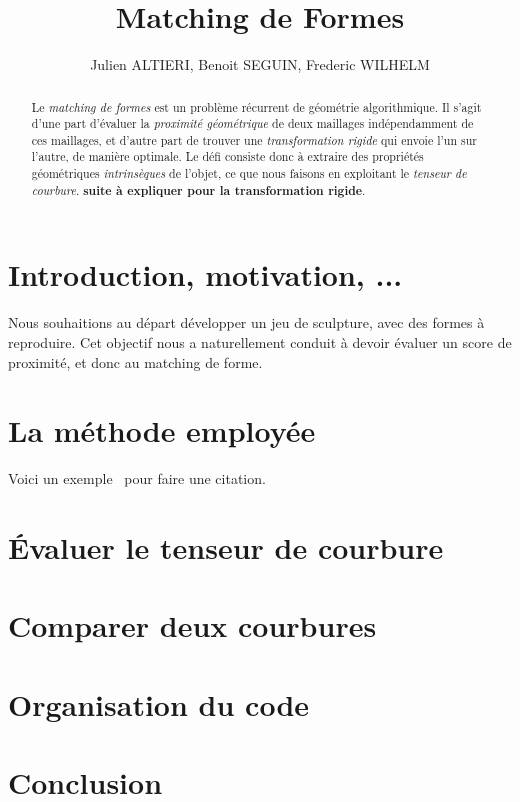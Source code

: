 \documentclass{llncs}
\begin{document}
\title{Matching de Formes}

\author{Julien ALTIERI, Benoit SEGUIN, Frederic WILHELM}



\maketitle

\begin{abstract}
Le \textit{matching de formes} est un probl\`eme r\'ecurrent de g\'eom\'etrie algorithmique. Il s'agit d'une part d'\'evaluer la \textit{proximit\'e g\'eom\'etrique} de deux maillages ind\'ependamment de ces maillages, et d'autre part de trouver une \textit{transformation rigide} qui envoie l'un sur l'autre, de mani\`ere optimale. Le d\'efi consiste donc à extraire des propri\'et\'es g\'eom\'etriques \textit{intrins\`eques} de l'objet, ce que nous faisons en exploitant le \textit{tenseur de courbure}. \textbf{suite \`a expliquer pour la transformation rigide}.
\end{abstract}

\section{Introduction, motivation, ...}
Nous souhaitions au d\'epart d\'evelopper un jeu de sculpture, avec des formes \`a reproduire. Cet objectif nous a naturellement conduit \`a devoir \'evaluer un score de proximit\'e, et donc au matching de forme.






\section{La m\'ethode employ\'ee}
Voici un exemple~\cite{rugis} pour faire une citation.


\section{\'Evaluer le tenseur de courbure}


\section{Comparer deux courbures}


\section{Organisation du code}


\section{Conclusion}




\end{document}
